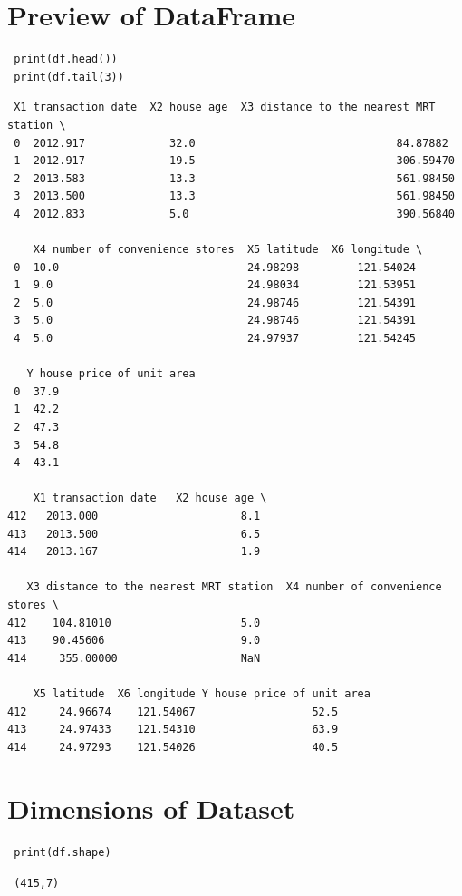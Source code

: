 \section{Preview of DataFrame}
\vspace{-.75cm}
\begin{code}
\begin{lstlisting}
 print(df.head())
 print(df.tail(3))
\end{lstlisting}
\end{code}
\vspace{-1cm}
\begin{verbatim}
 X1 transaction date  X2 house age  X3 distance to the nearest MRT station \
 0  2012.917             32.0                               84.87882
 1  2012.917             19.5                               306.59470
 2  2013.583             13.3                               561.98450
 3  2013.500             13.3                               561.98450
 4  2012.833             5.0                                390.56840
 
    X4 number of convenience stores  X5 latitude  X6 longitude \
 0  10.0                             24.98298         121.54024
 1  9.0                              24.98034         121.53951
 2  5.0                              24.98746         121.54391
 3  5.0                              24.98746         121.54391
 4  5.0                              24.97937         121.54245
 
   Y house price of unit area
 0  37.9
 1  42.2
 2  47.3
 3  54.8
 4  43.1
 
    X1 transaction date   X2 house age \
412   2013.000                      8.1
413   2013.500                      6.5
414   2013.167                      1.9

   X3 distance to the nearest MRT station  X4 number of convenience stores \
412    104.81010                    5.0
413    90.45606                     9.0
414     355.00000                   NaN

    X5 latitude  X6 longitude Y house price of unit area
412     24.96674    121.54067                  52.5
413     24.97433    121.54310                  63.9
414     24.97293    121.54026                  40.5
\end{verbatim}

\vspace{-.75cm}
\section{Dimensions of Dataset}
\vspace{-.75cm}
\begin{code}
\begin{lstlisting}
 print(df.shape)
\end{lstlisting}
\end{code}
\vspace{-1cm}
\begin{verbatim}
 (415,7)
\end{verbatim}
\vspace{-.75cm}
